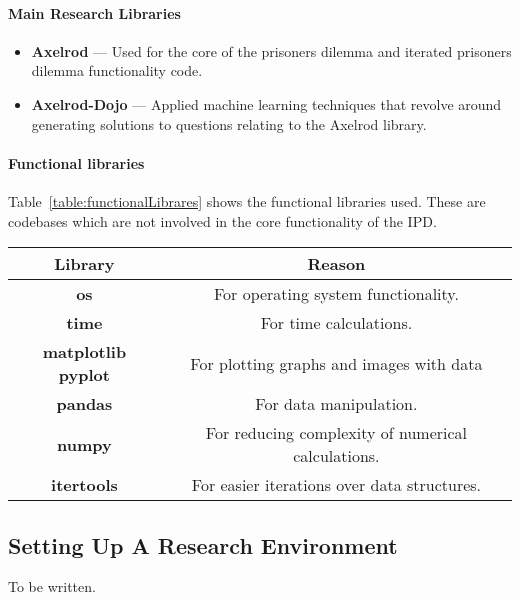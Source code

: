 \paragraph{Main Research Libraries}
\begin{itemize}
    \item \textbf{Axelrod} --- Used for the core of the prisoners dilemma and iterated prisoners dilemma functionality code.
    \item \textbf{Axelrod-Dojo} --- Applied machine learning techniques that revolve around generating solutions to questions relating to the Axelrod library.
\end{itemize}

\paragraph{Functional libraries}
Table~\ref{table:functionalLibrares} shows the functional libraries used.
These are codebases which are not involved in the core functionality of the IPD.
\begin{table*}[h]
    \centering
    \begin{tabular}{cc}
        \toprule
        Library & Reason\\
        \midrule
        \textbf{os} & For operating system functionality.\\
        \textbf{time} & For time calculations.\\
        \textbf{matplotlib pyplot} & For plotting graphs and images with data\\
        \textbf{pandas} & For data manipulation.\\
        \textbf{numpy} & For reducing complexity of numerical calculations.\\
        \textbf{itertools} & For easier iterations over data structures.\\
        \bottomrule
    \end{tabular}
    \caption{Functional Python libraries for analysis}\label{table:functionalLibrares}
\end{table*}


\subsection{Setting Up A Research Environment}
To be written.